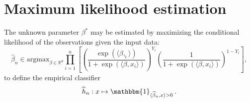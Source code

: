 \documentclass[a4paper,10pt,fleqn]{article}
\newcommand{\eqsp}{\,}
\newcommand{\1}{\ensuremath{\mathbbm{1}}}
\begin{document}
\section{Maximum likelihood estimation}
The unknown parameter $\beta^*$ may be estimated  by maximizing the conditional likelihood of the observations given the input data:
$$
\widehat \beta_n\in\mathrm{argmax}_{\beta\in\mathbb{R}^{d}}
\prod_{i=1}^n \left[ \left( \frac{\exp\left(\langle
	\beta,_{i}\rangle\right)}{1+\exp\left(\langle
	\beta,x_{i}\rangle\right)}\right)^{Y_{i}}
\left(\frac{1}{1+\exp\left(\langle
	\beta,x_{i}\rangle\right)}\right)^{1- Y_{i}} \right] ,
$$
to define the empirical classifier
$$
\widehat h_{n}: x \mapsto \1_{\langle \widehat\beta_n,x\rangle>0}\eqsp.
$$
\end{document}
